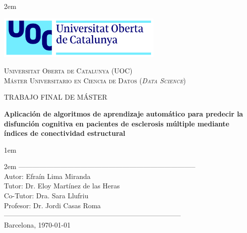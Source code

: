 \newpage
\thispagestyle{empty}

\baselineskip 2em


\centerline {\includegraphics[width=0.6\textwidth]{figs/UOC-logo}}
\begin{center}
\textsc{Universitat Oberta de Catalunya (UOC) \\
 Máster Universitario en Ciencia de Datos (\textit{Data Science})\\}


\vspace*{1.5cm}

\textsc{\Large TRABAJO FINAL DE MÁSTER}


\vspace*{1.5cm}

\textbf{\Large Aplicación de algoritmos de aprendizaje automático para predecir la disfunción cognitiva en pacientes de esclerosis múltiple mediante índices de conectividad estructural}


\vspace{2.5cm}
\baselineskip 1em

\vspace{1cm}
\baselineskip 2em
-----------------------------------------------------------------------------\\
Autor:      Efraín Lima Miranda\\
Tutor:   Dr. Eloy Martínez de las Heras\\
Co-Tutor:   Dra. Sara Llufriu\\
Profesor: Dr. Jordi Casas Roma\\

-----------------------------------------------------------------------------\\
\vspace*{1.0cm}
Barcelona, \today

\end{center}

